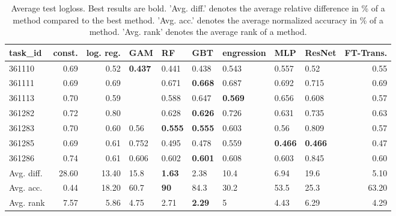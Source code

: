 \begin{table}[ht!]
\centering
\begingroup\footnotesize
\begin{tabular}{lrrllllllr}
  \hline
\hline
task\_id & const. & log. reg. & GAM & RF & GBT & engression & MLP & ResNet & FT-Trans. \\ 
  \hline
361110 & 0.69 & 0.52 & \textbf{0.437} & 0.441 & 0.438 & 0.543 & 0.557 & 0.52 & 0.55 \\ 
  361111 & 0.69 & 0.69 &  & 0.671 & \textbf{0.668} & 0.687 & 0.692 & 0.715 & 0.69 \\ 
  361113 & 0.70 & 0.59 &  & 0.588 & 0.647 & \textbf{0.569} & 0.656 & 0.608 & 0.57 \\ 
  361282 & 0.72 & 0.80 &  & 0.628 & \textbf{0.626} & 0.726 & 0.631 & 0.735 & 0.63 \\ 
  361283 & 0.70 & 0.60 & 0.56 & \textbf{0.555} & \textbf{0.555} & 0.603 & 0.56 & 0.809 & 0.57 \\ 
  361285 & 0.69 & 0.61 & 0.752 & 0.495 & 0.478 & 0.559 & \textbf{0.466} & \textbf{0.466} & 0.47 \\ 
  361286 & 0.74 & 0.61 & 0.606 & 0.602 & \textbf{0.601} & 0.608 & 0.603 & 0.845 & 0.60 \\ 
   \hline
Avg. diff. & 28.60 & 13.40 & 15.8 & \textbf{1.63} & 2.38 & 10.4 & 6.94 & 19.6 & 5.10 \\ 
  Avg. acc. & 0.44 & 18.20 & 60.7 & \textbf{90} & 84.3 & 30.2 & 53.5 & 25.3 & 63.20 \\ 
  Avg. rank & 7.57 & 5.86 & 4.75 & 2.71 & \textbf{2.29} & 5 & 4.43 & 6.29 & 4.29 \\ 
   \hline
\hline
\end{tabular}
\endgroup
\caption{Average test logloss. 
                  Best results are bold. 
                  'Avg. diff.' denotes the average relative difference in \% of a method compared to the best method.
                  'Avg. acc.' denotes the average normalized accuracy in \% of a method.
                  'Avg. rank' denotes the average rank of a method.} 
\label{TABLES/table_results_logloss_umap_num_and_cat_features}
\end{table}
